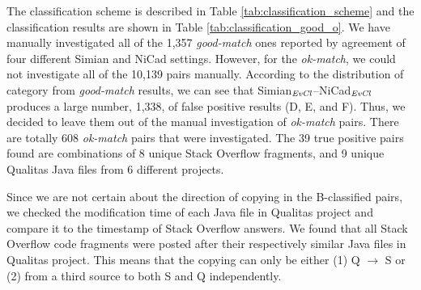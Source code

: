 \documentclass{sig-alternate-05-2015}
\begin{document}
The classification scheme is described in Table \ref{tab:classification_scheme} and the classification results are shown in Table \ref{tab:classification_good_o}. We have manually investigated all of the 1,357 \textit{good-match} ones reported by agreement of four different Simian and NiCad settings.  However, for the \textit{ok-match}, we could not investigate all of the 10,139 pairs manually.  According to the distribution of category from \textit{good-match} results, we can see that Simian$_{\textrm{\textit{EvCl}}}$--NiCad$_{\textrm{\textit{EvCl}}}$ produces a large number, 1,338, of false positive results (D, E, and F). Thus, we decided to leave them out of the manual investigation of \textit{ok-match} pairs. There are totally 608 \textit{ok-match} pairs that were investigated. The 39 true positive pairs found are combinations of 8 unique Stack Overflow fragments, and 9 unique Qualitas Java files from 6 different projects.

Since we are not certain about the direction of copying in the B-classified pairs, we checked the modification time of each Java file in Qualitas project and compare it to the timestamp of Stack Overflow answers. We found that all Stack Overflow code fragments were posted after their respectively similar Java files in Qualitas project. This means that the copying can only be either (1) Q $\rightarrow$ S or (2) from a third source to both S and Q independently.

\end{document}
